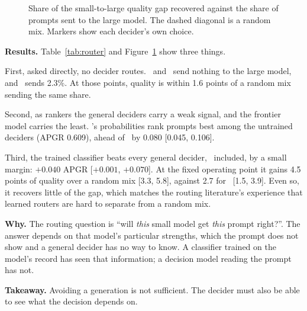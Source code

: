 \begin{figure}[t]
\centering
{}
\caption{Share of the small-to-large quality gap recovered against the share of prompts sent to the large model. The dashed diagonal is a random mix. Markers show each decider's own choice.}
\label{fig:router}
\end{figure}

\textbf{Results.} Table~\ref{tab:router} and Figure~\ref{fig:router} show three things.

First, asked directly, no decider routes.
\jev\ and \kev\ send nothing to the large model, and \gbig\ sends 2.3\%.
At those points, quality is within 1.6 points of a random mix sending the same share.

Second, as rankers the general deciders carry a weak signal, and the frontier model carries the least.
\jev's probabilities rank prompts best among the untrained deciders (APGR 0.609), ahead of \gbig\ by 0.080 [0.045, 0.106].

Third, the trained classifier beats every general decider, \jev\ included, by a small margin: $+0.040$ APGR [$+0.001$, $+0.070$].
At the fixed operating point it gains 4.5 points of quality over a random mix [3.3, 5.8], against 2.7 for \jev\ [1.5, 3.9].
Even so, it recovers little of the gap, which matches the routing literature's experience that learned routers are hard to separate from a random mix.

\textbf{Why.} The routing question is ``will \emph{this} small model get \emph{this} prompt right?''.
The answer depends on that model's particular strengths, which the prompt does not show and a general decider has no way to know.
A classifier trained on the model's record has seen that information; a decision model reading the prompt has not.

\textbf{Takeaway.} Avoiding a generation is not sufficient. The decider must also be able to see what the decision depends on.
